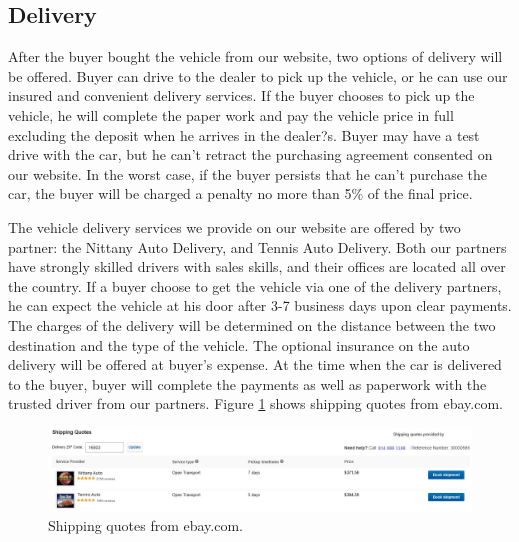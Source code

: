 \documentclass[12pt]{article}
\begin{document}
\subsection{Delivery}
After the buyer bought the vehicle from our website, two options of delivery will be offered. Buyer can drive to the dealer to pick up the vehicle, or he can use our insured and convenient delivery services. If the buyer chooses to pick up the vehicle, he will complete the paper work and pay the vehicle price in full excluding the deposit when he arrives in the dealer?s. Buyer may have a test drive with the car, but he can't retract the purchasing agreement consented on our website. In the worst case, if the buyer persists that he can't purchase the car, the buyer will be charged a penalty no more than 5\% of the final price.\par
The vehicle delivery services we provide on our website are offered by two partner: the Nittany Auto Delivery, and Tennis Auto Delivery. Both our partners have strongly skilled drivers with sales skills, and their offices are located all over the country. If a buyer choose to get the vehicle via one of the delivery partners, he can expect the vehicle at his door after 3-7 business days upon clear payments. The charges of the delivery will be determined on the distance between the two destination and the type of the vehicle. The optional insurance on the auto delivery will be offered at buyer's expense. At the time when the car is delivered to the buyer, buyer will complete the payments as well as paperwork with the trusted driver from our partners. Figure \ref{delivery} shows shipping quotes from ebay.com.
\begin{figure}[!h]
\caption{Shipping quotes from ebay.com.} \label{delivery}
\begin{center}
\includegraphics[width=13cm]{delivery}
\end{center}
\end{figure}
\end{document}
